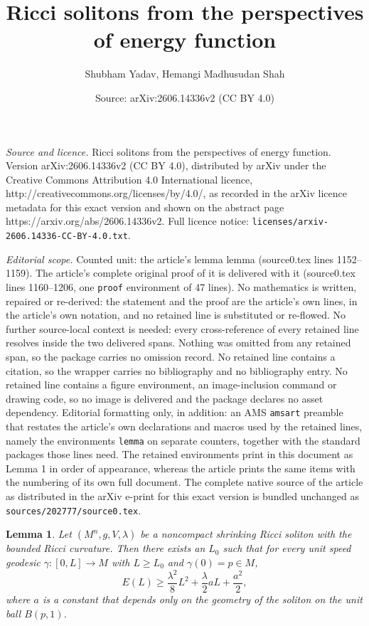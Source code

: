\documentclass[10pt,a4paper]{amsart}
\title{Ricci solitons from the perspectives of energy function}
\author{Shubham Yadav, Hemangi Madhusudan Shah}
\date{Source: arXiv:2606.14336v2 (CC BY 4.0)}
\newtheorem{lemma}{Lemma}
\begin{document}
\maketitle

\noindent\emph{Source and licence.} Ricci solitons from the perspectives of energy function. Version arXiv:2606.14336v2 (CC BY 4.0), distributed by arXiv under the Creative Commons Attribution 4.0 International licence, http://creativecommons.org/licenses/by/4.0/, as recorded in the arXiv licence metadata for this exact version and shown on the abstract page https://arxiv.org/abs/2606.14336v2. Full licence notice: \texttt{licenses/arxiv-2606.14336-CC-BY-4.0.txt}.\par\smallskip

\noindent\textit{Editorial scope.} Counted unit: the article's lemma lemma (source0.tex lines 1152--1159). The article's complete original proof of it is delivered with it (source0.tex lines 1160--1206, one \texttt{proof} environment of 47 lines). No mathematics is written, repaired or re-derived: the statement and the proof are the article's own lines, in the article's own notation, and no retained line is substituted or re-flowed.  No further source-local context is needed: every cross-reference of every retained line resolves inside the two delivered spans.  Nothing was omitted from any retained span, so the package carries no omission record.  No retained line contains a citation, so the wrapper carries no bibliography and no bibliography entry.  No retained line contains a figure environment, an image-inclusion command or drawing code, so no image is delivered and the package declares no asset dependency.  Editorial formatting only, in addition: an AMS \texttt{amsart} preamble that restates the article's own declarations and macros used by the retained lines, namely the environments \texttt{lemma} on separate counters, together with the standard packages those lines need.  The retained environments print in this document as Lemma 1 in order of appearance, whereas the article prints the same items with the numbering of its own full document.  The complete native source of the article as distributed in the arXiv e-print for this exact version is bundled unchanged as \texttt{sources/202777/source0.tex}.
\begin{lemma}
	Let $(M^n,g,V,\lambda)$ be a noncompact shrinking Ricci soliton with the bounded Ricci curvature. 
Then  there exists an $L_0$ such that for every 
	unit speed geodesic $\gamma: [0,L] \to M $ with $L\geq L_0$ and 
	$\gamma (0) = p \in M $,
	$$ E (L) \geq \frac{\lambda^2}{8} L^2 + \frac{\lambda}{2} a L + \frac{a^2}{2},  $$
	where $a$ is a constant that depends only on the geometry of the soliton on the unit ball $B(p,1)$.
\end{lemma}
\end{document}
